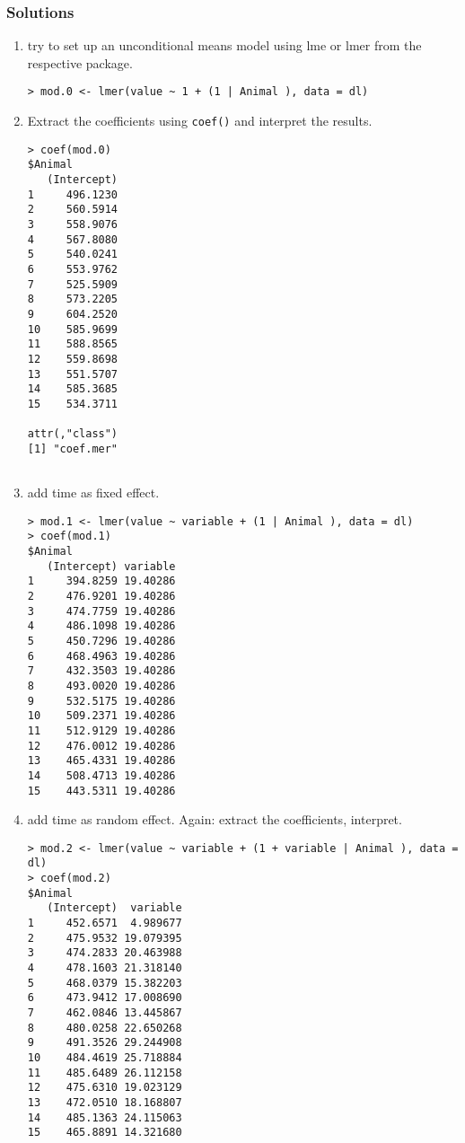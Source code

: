 \begin{frame}\frametitle{Solutions}
  \begin{enumerate}
  \item try to set up an unconditional means model using lme or lmer from the respective package.\scriptsize
\begin{verbatim}
> mod.0 <- lmer(value ~ 1 + (1 | Animal ), data = dl)

\end{verbatim}
\normalsize
  \item Extract the coefficients using \texttt{coef()} and interpret the results.\scriptsize
\begin{verbatim}
> coef(mod.0)
$Animal
   (Intercept)
1     496.1230
2     560.5914
3     558.9076
4     567.8080
5     540.0241
6     553.9762
7     525.5909
8     573.2205
9     604.2520
10    585.9699
11    588.8565
12    559.8698
13    551.5707
14    585.3685
15    534.3711

attr(,"class")
[1] "coef.mer"  
  
\end{verbatim}
\normalsize
  \item add time as fixed effect.\scriptsize
\begin{verbatim}
> mod.1 <- lmer(value ~ variable + (1 | Animal ), data = dl)
> coef(mod.1)
$Animal
   (Intercept) variable
1     394.8259 19.40286
2     476.9201 19.40286
3     474.7759 19.40286
4     486.1098 19.40286
5     450.7296 19.40286
6     468.4963 19.40286
7     432.3503 19.40286
8     493.0020 19.40286
9     532.5175 19.40286
10    509.2371 19.40286
11    512.9129 19.40286
12    476.0012 19.40286
13    465.4331 19.40286
14    508.4713 19.40286
15    443.5311 19.40286
\end{verbatim}
\normalsize
  \item add time as random effect. Again: extract the coefficients, interpret.\scriptsize
\begin{verbatim}
> mod.2 <- lmer(value ~ variable + (1 + variable | Animal ), data = dl)
> coef(mod.2)
$Animal
   (Intercept)  variable
1     452.6571  4.989677
2     475.9532 19.079395
3     474.2833 20.463988
4     478.1603 21.318140
5     468.0379 15.382203
6     473.9412 17.008690
7     462.0846 13.445867
8     480.0258 22.650268
9     491.3526 29.244908
10    484.4619 25.718884
11    485.6489 26.112158
12    475.6310 19.023129
13    472.0510 18.168807
14    485.1363 24.115063
15    465.8891 14.321680


\end{verbatim}
\end{enumerate}
\end{frame}
